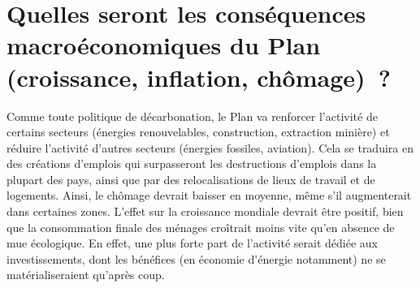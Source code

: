 \documentclass[a5paper,french]{memoir}
\begin{document}
\section*{\normalsize Quelles seront les conséquences macroéconomiques du Plan (croissance, inflation, chômage)~?}\label{q:macro}

Comme toute politique de décarbonation, le Plan va renforcer l'activité de certains secteurs (énergies renouvelables, construction, extraction minière) et réduire l'activité d'autres secteurs (énergies fossiles, aviation). Cela se traduira en des créations d'emplois qui surpasseront les destructions d'emplois dans la plupart des pays, ainsi que par des relocalisations de lieux de travail et de logements. Ainsi, le chômage devrait baisser en moyenne, même s'il augmenterait dans certaines zones. L'effet sur la croissance mondiale devrait être positif, bien que la consommation finale des ménages croîtrait moins vite qu'en absence de mue écologique. En effet, une plus forte part de l'activité serait dédiée aux investissements, dont les bénéfices (en économie d'énergie notamment) ne se matérialiseraient qu'après coup. 
\end{document}
